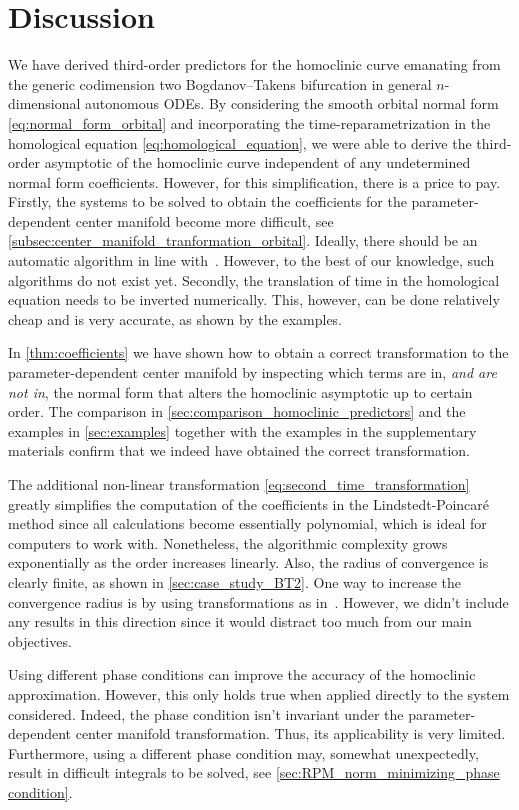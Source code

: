 \section{Discussion}%
We have derived third-order predictors for the homoclinic curve emanating from
the generic codimension two Bogdanov--Takens bifurcation in general
$n$-dimensional autonomous ODEs. By considering the smooth orbital normal form
\cref{eq:normal_form_orbital} and incorporating the time-re\-pa\-ram\-e\-triza\-tion in the
homological equation \cref{eq:homological_equation}, we were able to derive
the third-order asymptotic of the homoclinic curve independent of any undetermined
normal form coefficients. However, for this simplification, there is a price to
pay. Firstly, the systems to be solved to obtain the coefficients for the
parameter-dependent center manifold become more difficult, see
\cref{subsec:center_manifold_tranformation_orbital}. Ideally, there should be
an automatic algorithm in line with~\cite{Murdock@2003}. However, to the best
of our knowledge, such algorithms do not exist yet.  Secondly, the translation
of time in the homological equation needs to be inverted numerically. This,
however, can be done relatively cheap and is very accurate, as shown by the
examples.

In \cref{thm:coefficients} we have shown how to obtain a correct transformation to the
parameter-dependent center manifold by inspecting which terms are in, \emph{and
are not in}, the normal form that alters the homoclinic asymptotic up to
certain order. The comparison in \cref{sec:comparison_homoclinic_predictors}
and the examples in \cref{sec:examples} together with the examples in the
supplementary materials confirm that we indeed have obtained the correct
transformation.

The additional non-linear transformation
\cref{eq:second_time_transformation} greatly simplifies the computation
of the coefficients in the Lindstedt-Poincar\'e method since all calculations
become essentially polynomial, which is ideal for computers to work with.
Nonetheless, the algorithmic complexity grows exponentially as the order
increases linearly. Also, the radius of convergence is clearly finite, as shown
in \cref{sec:case_study_BT2}. One way to increase the convergence radius is by
using transformations as in~\cite{Milton@1974}. However, we didn't include any
results in this direction since it would distract too much from our main
objectives.

Using different phase conditions can improve the accuracy of the homoclinic
approximation. However, this only holds true when applied directly to the system
considered. Indeed, the phase condition isn't invariant under the
parameter-dependent center manifold transformation. Thus, its applicability is
very limited. Furthermore, using a different phase condition may, somewhat
unexpectedly, result in difficult integrals to be solved, see
\cref{sec:RPM_norm_minimizing_phase condition}.

